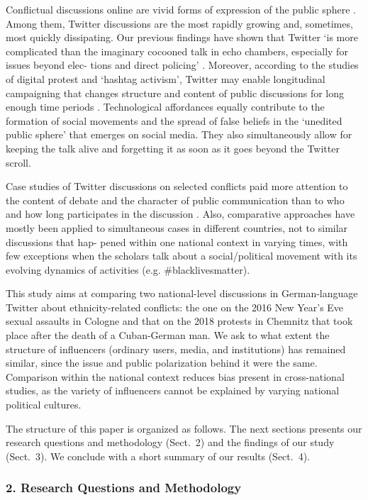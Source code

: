 Conflictual discussions online are vivid forms of expression of the public sphere \cite{BodrunovaBlekanovSmoliarova}. Among them, Twitter discussions are the most rapidly growing and, sometimes, most quickly dissipating. Our previous findings have shown that Twitter ‘is more complicated than the imaginary cocooned talk in echo chambers, especially for issues beyond elec- tions and direct policing’ \cite[p.~130]{BodrunovaBlekanovSmoliarova}. Moreover, according to the studies of digital protest and ‘hashtag activism’, Twitter may enable longitudinal campaigning that changes structure and content of public discussions for long enough time periods \cite{BonillaRosa}. Technological affordances equally contribute to the formation of social movements and the spread of false beliefs in the ‘unedited public sphere’ \cite{BimberDeZuniga} that emerges on social media. They also simultaneously allow for keeping the talk alive and forgetting it as soon as it goes beyond the Twitter scroll.

Case studies of Twitter discussions on selected conflicts paid more attention to the content of debate and the character of public communication than to who and how long participates in the discussion \cite{GroshekTandoc}. Also, comparative approaches have mostly been applied to simultaneous cases in different countries, not to similar discussions that hap- pened within one national context in varying times, with few exceptions when the scholars talk about a social/political movement with its evolving dynamics of activities (e.g. \#blacklivesmatter).

This study aims at comparing two national-level discussions in German-language Twitter about ethnicity-related conflicts: the one on the 2016 New Year’s Eve sexual assaults in Cologne and that on the 2018 protests in Chemnitz that took place after the death of a Cuban-German man. We ask to what extent the structure of influencers (ordinary users, media, and institutions) has remained similar, since the issue and public polarization behind it were the same. Comparison within the national context reduces bias present in cross-national studies, as the variety of influencers cannot be explained by varying national political cultures.

The structure of this paper is organized as follows. The next sections presents our research questions and methodology (Sect.~2) and the findings of our study (Sect.~3). We conclude with a short summary of our results (Sect.~4).

\subsubsection{2. Research Questions and Methodology}

